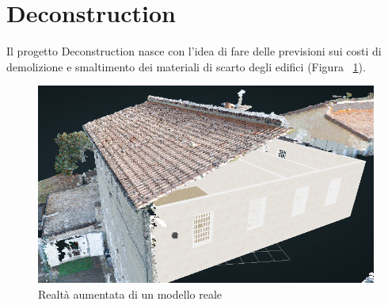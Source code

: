 \section{Deconstruction}
\label{sec:chapter_4_section_3}

Il progetto Deconstruction nasce con l'idea di fare delle previsioni
sui costi di demolizione e smaltimento dei materiali di scarto degli edifici (Figura ~\ref{fig:augmented}).

\begin{figure}[htbp] %
   \centering
   \includegraphics[width=1\linewidth]{images/augmented}
   \caption{Realtà aumentata di un modello reale}
   \label{fig:augmented}
\end{figure}
\newpage
